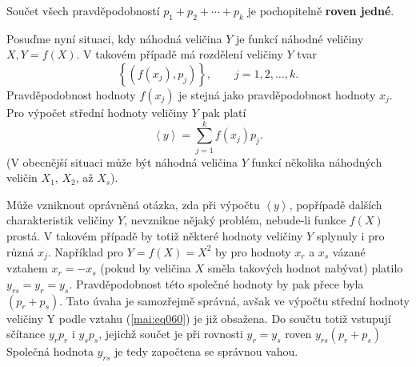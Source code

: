       Součet všech pravděpodobností \(p_1 + p_2 + \cdots + p_k\) je pochopitelně \textbf{roven 
      jedné}.

    
    
    Posuďme nyní situaci, kdy náhodná veličina \(Y\) je funkcí náhodné veličiny \(X, Y = f(X)\).
    V takovém případě má rozdělení veličiny \(Y\) tvar
    \begin{equation*}
      \left\lbrace (f(x_j), p_j)\right\rbrace, \qquad j = 1, 2, \ldots, k.
    \end{equation*}
    Pravděpodobnost hodnoty \(f(x_j)\) je stejná jako pravděpodobnost hodnoty \(x_j\). Pro výpočet
    střední hodnoty veličiny \(Y\) pak platí
    \begin{equation}\label{mai:eq060}
      \left\langle y \right\rangle = \sum_{j=1}^{k}f(x_j)p_j.
    \end{equation}
    (V obecnější situaci může být náhodná veličina \(Y\) funkcí několika náhodných veličin \(X_1\), 
    \(X_2\), až \(X_s\)).
    
    Může vzniknout oprávněná otázka, zda při výpočtu \(\left\langle y \right\rangle\), popřípadě 
    dalších charakteristik veličiny \(Y\), nevznikne nějaký problém, nebude-li funkce \(f(X)\) 
    prostá. V takovém případě by totiž některé hodnoty veličiny \(Y\) splynuly i pro různá \(x_j\). 
    Například pro \(Y = f(X) = X^2\) by pro hodnoty \(x_r\) a \(x_s\) vázané vztahem \(x_r = -x_s\) 
    (pokud by veličina \(X\) směla takových hodnot nabývat) platilo \(y_{rs} = y_r = y_s\). 
    Pravděpodobnost této společné hodnoty by pak přece byla \((p_r + p_s)\). Tato úvaha je 
    samozřejmě správná, avšak ve výpočtu střední hodnoty veličiny Y
    podle vztahu (\ref{mai:eq060}) je již obsažena. Do součtu totiž vstupují sčítance \(y_rp_r\) i 
    \(y_sp_s\), jejichž součet je při rovnosti \(y_r = y_s\) roven \(y_{rs}(p_r +p_s)\) Společná 
    hodnota \(y_{rs}\) je tedy započtena se správnou vahou.
    
